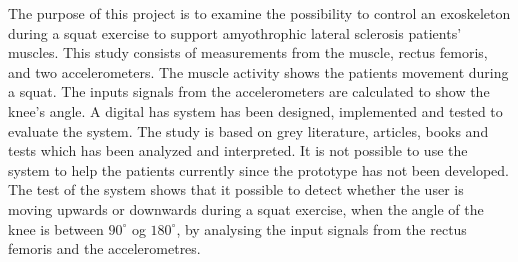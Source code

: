 The purpose of this project is to examine the possibility to control an exoskeleton during a squat exercise to support amyothrophic lateral sclerosis patients' muscles. This study consists of measurements from the muscle, rectus femoris, and two accelerometers. The muscle activity shows the patients movement during a squat. The inputs signals from the accelerometers are calculated to show the knee's angle. A digital has system has been designed, implemented and tested to evaluate the system. The study is based on grey literature, articles, books and tests which has been analyzed and interpreted. It is not possible to use the system to help the patients currently since the prototype has not been developed. The test of the system shows that it possible to detect whether the user is moving upwards or downwards during a squat exercise, when the angle of the knee is between $90^{\circ}$ og $180^{\circ}$, by analysing the input signals from the rectus femoris and the accelerometres. 